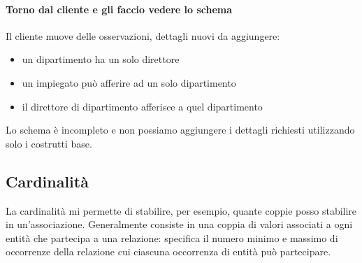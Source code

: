 \paragraph{Torno dal cliente e gli faccio vedere lo schema} Il cliente muove delle osservazioni, dettagli nuovi da aggiungere:
\begin{itemize}
	\item un dipartimento ha un solo direttore
	\item un impiegato può afferire ad un solo dipartimento
	\item il direttore di dipartimento afferisce a quel dipartimento
\end{itemize}
Lo schema è incompleto e non possiamo aggiungere i dettagli richiesti utilizzando solo i costrutti base.

\subsection{Cardinalità}
La cardinalità mi permette di stabilire, per esempio, quante coppie posso stabilire in un'associazione. Generalmente consiste in una coppia di valori associati a ogni entità che partecipa a una relazione: specifica il numero minimo e massimo di occorrenze della relazione cui ciascuna occorrenza di entità può partecipare.\\

